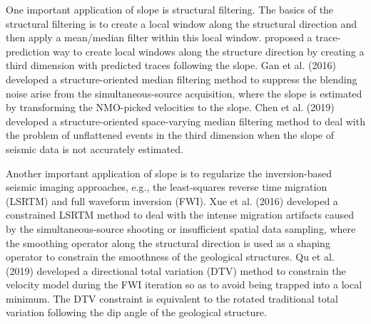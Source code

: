 One important application of slope is structural filtering. The basics of the structural filtering is to create a local window along the structural direction and then apply a mean/median filter within this local window.  \cite{liuyang2010} proposed a trace-prediction way to create local windows along the structure direction by creating a third dimension with predicted traces following the slope. Gan et al. (2016) \cite{shuwei2016somf} developed a structure-oriented median filtering method to suppress the blending noise arise from the simultaneous-source acquisition, where the slope is estimated by transforming the NMO-picked velocities to the slope. Chen et al. (2019) \cite{sosvmf} developed a structure-oriented space-varying median filtering method to deal with the problem of unflattened events in the third  dimension when the slope of seismic data is not accurately estimated. 

Another important application of slope is to regularize the inversion-based seismic imaging approaches, e.g., the least-squares reverse time migration (LSRTM) and full waveform inversion (FWI). Xue et al. (2016) \cite{zhiguang2016} developed a constrained LSRTM method to deal with the intense migration artifacts caused by the simultaneous-source shooting or insufficient spatial data sampling, where the smoothing operator along the structural direction is used as a shaping operator to constrain the smoothness of the geological structures. Qu et al. (2019) \cite{qushan2019geo} developed a directional total variation (DTV) method to constrain the velocity model during the FWI iteration so as to avoid being trapped into a local minimum. The DTV constraint is equivalent to the rotated traditional total variation following the dip angle of the geological structure. 


